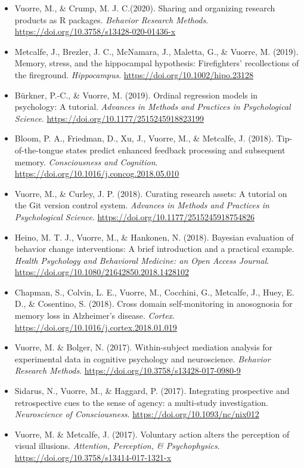 \documentclass[12pt, a4paper]{article}
\newcommand{\years}[1]{\marginnote{\scriptsize #1}}
\begin{document}
\begin{itemize}
\item \years{2020} Vuorre, M.\footnotemark[1], \& Crump, M. J. C.\footnotemark[1] (2020). Sharing and organizing research products as R packages. \emph{Behavior Research Methods}. \url{https://doi.org/10.3758/s13428-020-01436-x}
\item \years{2019} Metcalfe, J., Brezler, J. C., McNamara, J., Maletta, G., \& Vuorre, M. (2019). Memory, stress, and the hippocampal hypothesis: Firefighters' recollections of the fireground. \emph{Hippocampus}. \url{https://doi.org/10.1002/hipo.23128}
\item Bürkner, P.-C., \& Vuorre, M. (2019). Ordinal regression models in psychology: A tutorial. \emph{Advances in Methods and Practices in Psychological Science}. \url{https://doi.org/10.1177/2515245918823199}
\item \years{2018} Bloom, P. A., Friedman, D., Xu, J., Vuorre, M., \& Metcalfe, J. (2018). Tip-of-the-tongue states predict enhanced feedback processing and subsequent memory. \emph{Consciousness and Cognition}. \url{https://doi.org/10.1016/j.concog.2018.05.010}
\item Vuorre, M., \& Curley, J. P. (2018). Curating research assets: A tutorial on the Git version control system. \emph{Advances in Methods and Practices in Psychological Science}. \url{https://doi.org/10.1177/2515245918754826}
\item Heino, M. T. J.\footnotemark[1], Vuorre, M.\footnotemark[1], \& Hankonen, N. (2018). Bayesian evaluation of behavior change interventions: A brief introduction and a practical example. \emph{Health Psychology and Behavioral Medicine: an Open Access Journal}. \url{https://doi.org/10.1080/21642850.2018.1428102}
\item Chapman, S., Colvin, L. E., Vuorre, M., Cocchini, G., Metcalfe, J., Huey, E. D., \& Cosentino, S. (2018). Cross domain self-monitoring in anosognosia for memory loss in Alzheimer's disease. \emph{Cortex}. \url{https://doi.org/10.1016/j.cortex.2018.01.019}
\item \years{2017} Vuorre, M. \& Bolger, N. (2017). Within-subject mediation analysis for experimental data in cognitive psychology and neuroscience. \emph{Behavior Research Methods}. \url{https://doi.org/10.3758/s13428-017-0980-9}
\item Sidarus, N., Vuorre, M., \& Haggard, P. (2017). Integrating prospective and retrospective cues to the sense of agency: a multi-study investigation. \emph{Neuroscience of Consciousness}. \url{https://doi.org/10.1093/nc/nix012}
\item Vuorre, M. \& Metcalfe, J. (2017). Voluntary action alters the perception of visual illusions. \emph{Attention, Perception, \& Psychophysics}. \url{https://doi.org/10.3758/s13414-017-1321-x}

\end{itemize}
\end{document}
